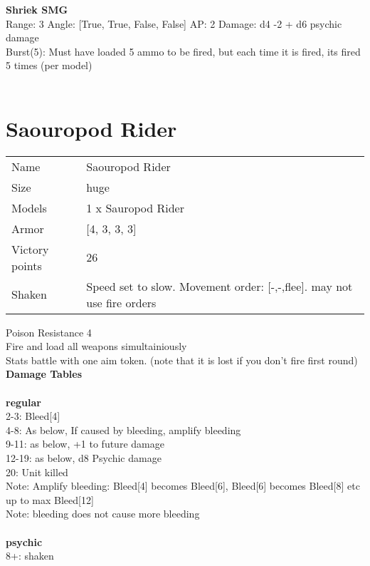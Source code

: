 {\bf Shriek SMG } \\



Range: 3  Angle: [True, True, False, False] AP: 2 Damage: d4 -2 + d6 psychic damage \\
Burst(5): Must have loaded 5 ammo to be fired, but each time it is fired, its fired 5 times (per model)\\ 




 
\ \\














\pagebreak\clearpage

\section{ Saouropod Rider }

\begin{tabular}{ll}
  Name & Saouropod Rider \\
  Size & huge\\
  Models & 1 x Sauropod Rider\\
  Armor & [4, 3, 3, 3]\\
  Victory points & 26\\
  Shaken & Speed set to slow. Movement order: [-,-,flee]. may not use fire orders\\
\end{tabular}

Poison Resistance 4\\ 
Fire and load all weapons simultainiously\\ 
Stats battle with one aim token. (note that it is lost if you don't fire first round)\\ 



{\bf Damage Tables} \\
\ \\ {\bf regular } \\
2-3: Bleed[4] \\
4-8: As below, If caused by bleeding, amplify bleeding \\
9-11: as below, +1 to future damage \\
12-19: as below, d8 Psychic damage \\
20: Unit killed \\
Note: Amplify bleeding: Bleed[4] becomes Bleed[6], Bleed[6] becomes Bleed[8] etc up to max Bleed[12] \\
Note: bleeding does not cause more bleeding \\
\ \\ {\bf psychic } \\
8+: shaken \\


